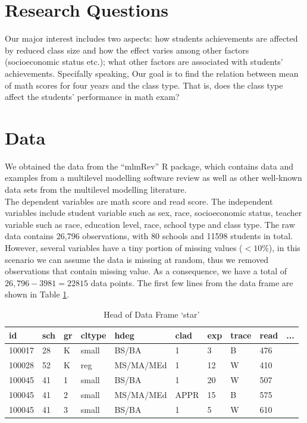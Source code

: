 \documentclass[11pt,a4paper]{article}
\begin{document}
\section{Research Questions}

Our major interest includes two aspects: how students achievements are affected by reduced class size and how the effect varies 
among other factors (socioeconomic status etc.); what other factors are associated with students’ achievements. Specifally speaking, 
Our goal is to find the relation between mean of math scores for four years and the class type. That is, does the class type affect the students’ 
performance in math exam?\\

\section{Data}

We obtained the data from the “mlmRev” R package, which contains data and examples from a multilevel modelling software review 
as well as other well-known data sets from the multilevel modelling literature.\\

The dependent variables are math score and read score. The independent variables include student variable such as sex, race, 
socioeconomic status, teacher variable such as race, education level, race, school type and class type. The raw data contains 26,796 
observations, with 80 schools and 11598 students in total. However, several variables have a tiny portion of missing values ($< 10\%$), 
in this scenario we can assume the data is missing at random, thus we removed observations that contain missing value. 
As a consequence, we have a total of $26,796 - 3981 = 22815$ data points. The first few lines from the data frame are shown in Table 
\ref{table:data}.\\

\begin{table}[h]
    \centering
    \caption{Head of Data Frame ‘star’}
    \label{table:data}
    \begin{tabular}{|l|l|l|l|l|l|l|l|l|l|}
    \hline
    id     & sch & gr & cltype & hdeg      & clad & exp & trace & read & ... \\ \hline
    100017 & 28  & K  & small  & BS/BA     & 1    & 3   & B     & 476  &     \\ \hline
    100028 & 52  & K  & reg    & MS/MA/MEd & 1    & 12  & W     & 410  &     \\ \hline
    100045 & 41  & 1  & small  & BS/BA     & 1    & 20  & W     & 507  &     \\ \hline
    100045 & 41  & 2  & small  & MS/MA/MEd & APPR & 15  & B     & 575  &     \\ \hline
    100045 & 41  & 3  & small  & BS/BA     & 1    & 5   & W     & 610  &     \\ \hline
    \end{tabular}
\end{table}
\end{document}
